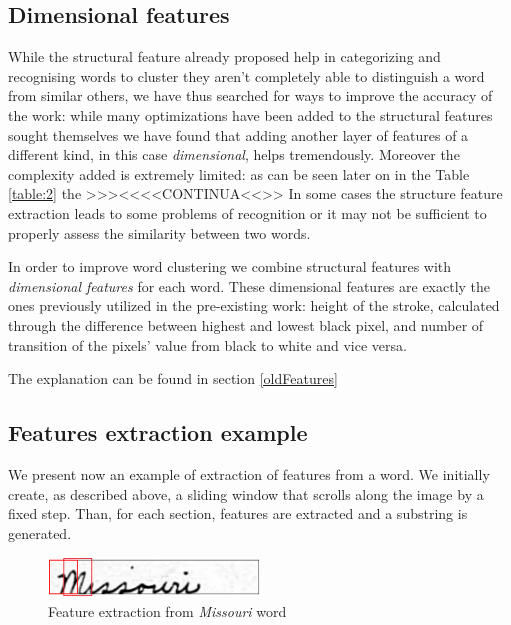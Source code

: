 \subsection{Dimensional features}
While the structural feature already proposed help in categorizing and recognising words to cluster they aren't completely able to distinguish a word from similar others, we have thus searched for ways to improve the accuracy of the work:
while many optimizations have been added to the structural features sought themselves we have found that adding another layer of features of a different kind, in this case \emph{dimensional}, helps tremendously.
Moreover the complexity added is extremely limited: as can be seen later on in the Table \ref{table:2} the >>><<<<CONTINUA<<>>
In some cases the structure feature extraction leads to some problems of recognition or it may not be sufficient to properly assess the similarity between two words.

In order to improve word clustering we combine structural features with \emph{dimensional features} for each word. 
These dimensional features are exactly the ones previously utilized in the pre-existing work: height of the stroke, calculated through the difference between highest and lowest black pixel, and number of transition of the pixels' value from black to white and vice versa.

The explanation can be found in section \ref{oldFeatures}

\subsection{Features extraction example}

We present now an example of extraction of features from a word. We initially create, as described above, a sliding window that scrolls along the image by a fixed step. Than, for each section,  features are extracted and a substring is generated.

\begin{figure}[!ht]
\centering
\includegraphics[width=0.5\textwidth]{images/missouri_crop.jpg}
\caption{Feature extraction from \emph{Missouri} word}
\end{figure} 

